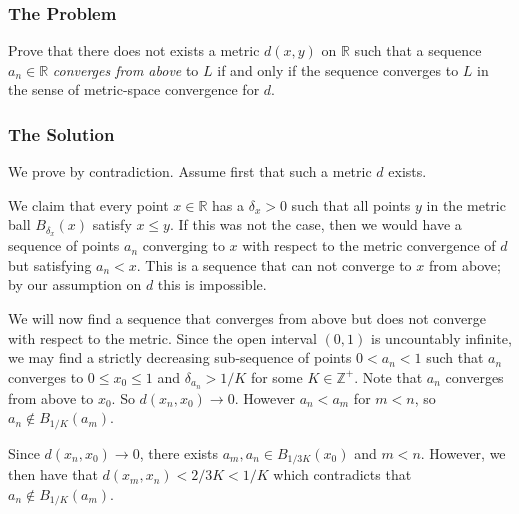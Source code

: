 \subsubsection*{The Problem}

Prove that there does not exists a metric \(d(x, y)\) on \(\mathbb R\) such that a sequence \(a_n \in \mathbb R\)
\textit{converges from above} to \(L\) if and only if the sequence converges to \(L\) in the sense of metric-space
convergence for \(d\).

\subsubsection*{The Solution}

We prove by contradiction. Assume first that such a metric \(d\) exists.

We claim that every point \(x \in \mathbb R\) has a \(\delta_x > 0\) such that all points \(y\) in the metric ball
\(B_{\delta_x}(x)\) satisfy \(x \leq y\). If this was not the case, then we would have a sequence of points \(a_n\)
converging to \(x\) with respect to the metric convergence of \(d\) but satisfying \(a_n < x\). This is a sequence
that can not converge to \(x\) from above; by our assumption on \(d\) this is impossible. 

We will now find a sequence that converges from above but does not converge with respect to the metric. Since
the open interval \((0, 1)\) is uncountably infinite, we
may find a strictly decreasing sub-sequence of points \(0 < a_n < 1\) such that \(a_n\)
converges to \(0 \leq x_0 \leq 1\)
and \(\delta_{a_n} > 1 / K\) for some \(K \in \mathbb Z^+\). Note that \(a_n\) converges from above to \(x_0\). 
So \(d(x_n, x_0) \to 0\). However \(a_n < a_m\) for \(m < n\), so \(a_n \not\in B_{1/K}(a_m)\).  

Since \(d(x_n, x_0) \to 0\), there exists \(a_m, a_n \in B_{1/3K}(x_0)\) and \(m < n\). However, we then have that
\(d(x_m, x_n) < 2 / 3K < 1/K\) which contradicts that \(a_n \not\in B_{1/K}(a_m)\).

